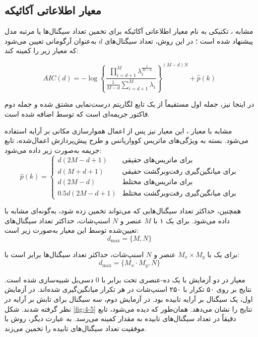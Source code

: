 \subsection{معیار اطلاعاتی آکائیکه}
\label{subsec:4-3-3}
مشابه ، تکنیکی به نام معیار اطلاعاتی آکائیکه برای تخمین تعداد سیگنال‌ها یا مرتبه مدل پیشنهاد شده است \cite{4-10, 4-11}؛ در این روش، تعداد سیگنال‌های $d$ به‌عنوان آرگومانی تعیین می‌شود که معیار زیر را کمینه کند:

\begin{equation}
	AIC(d) = -\log \left\{ \frac{\prod_{i=d+1}^{M} \lambda_i^{\frac{1}{M-d}}}{\frac{1}{M-d} \sum_{i=d+1}^{M} \lambda_i} \right\}^{(M-d)N} + \hat{p}(k)
	\label{eq:4-25}
\end{equation}

در اینجا نیز، جمله اول مستقیماً از یک تابع لگاریتم درست‌نمایی مشتق شده و جمله دوم فاکتور جریمه‌ای است که توسط  اضافه شده است.



مشابه با معیار ، این معیار نیز پس از اعمال هموارسازی مکانی بر آرایه استفاده می‌شود. بسته به ویژگی‌های ماتریس کوواریانس و طرح پیش‌پردازش اعمال‌شده، تابع جریمه به‌صورت زیر داده می‌شود:
\begin{equation}
	\hat{p}(k) = 
	\begin{cases} 
		d(2M - d + 1) & \text{برای ماتریس‌های حقیقی} \\
		d(M + d + 1) & \text{برای میانگین‌گیری رفت‌وبرگشت حقیقی} \\
		d(2M - d) & \text{برای ماتریس‌های مختلط} \\
		0.5d(2M - d + 1) & \text{برای میانگین‌گیری رفت‌وبرگشت مختلط}
	\end{cases}
	\label{eq:4-26}
\end{equation}

همچنین، حداکثر تعداد سیگنال‌هایی که می‌تواند تخمین زده شود، به‌گونه‌ای مشابه با  داده می‌شود. برای یک ۱ با $M$ عنصر و $N$ اسنپ‌شات، حداکثر تعداد سیگنال‌های تعیین‌شده توسط این معیار به‌صورت زیر است:
\begin{equation}
	d_{\max} = \{M, N\}
	\label{eq:4-27}
\end{equation}

برای یک  با $M_x \times M_y$ عنصر و $N$ اسنپ‌شات، حداکثر تعداد سیگنال‌ها برابر است با:
\begin{equation}
	d_{\max} = \{M_x \cdot M_y, N\}
	\label{eq:4-28}
\end{equation}

معیار  در دو آزمایش با یک  ده-عنصری تحت  برابر با $0$ دسی‌بل شبیه‌سازی شده است. نتایج بر روی ۵۰ تکرار با ۲۵۰ اسنپ‌شات در هر تکرار میانگین‌گیری شده‌اند. در آزمایش اول، یک سیگنال بر آرایه تابیده بود. در آزمایش دوم، سه سیگنال برای تابش بر آرایه در نظر گرفته شدند. شکل \ref{fig:4-5} نتایج را نشان می‌دهد. همان‌طور که دیده می‌شود، تابع دقیقاً در تعداد سیگنال‌های تابیده به مقدار کمینه می‌رسد. به عبارت دیگر، روش  با موفقیت تعداد سیگنال‌های تابیده را تخمین می‌زند.

